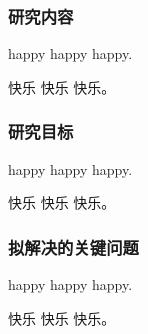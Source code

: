 
\subsubsection{研究内容}

happy happy happy.

快乐 快乐 快乐。

\subsubsection{研究目标}

happy happy happy.

快乐 快乐 快乐。

\subsubsection{拟解决的关键问题}

happy happy happy.

快乐 快乐 快乐。

\clearpage